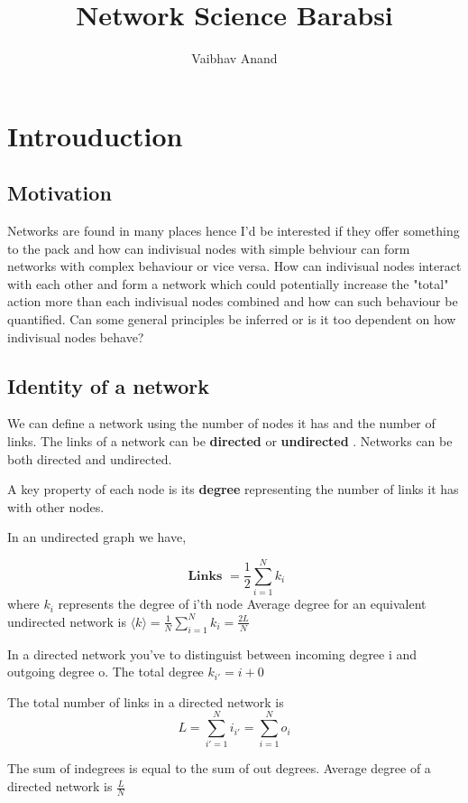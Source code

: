 \documentclass{article}
\title{Network Science Barabsi }
\author{Vaibhav Anand}
\begin{document}
\maketitle

\section{Introuduction}
\subsection{Motivation}

Networks are found in many places hence I'd be interested if they offer something to the pack and how can indivisual nodes with simple behviour can form networks with complex behaviour or vice versa. How can indivisual nodes interact with each other and form a network which could potentially increase the "total" action more than each indivisual nodes combined and how can such behaviour be quantified. Can some general principles be inferred or is it too dependent on how indivisual nodes behave?  

\subsection{Identity of a network}
We can define a network using the number of nodes it has and the number of links. The links of a network can be \textbf{ directed } or \textbf{ undirected }. Networks can be both directed and undirected. 

A key property of each node is its \textbf{ degree } representing the number of links it has with other nodes. 

In an undirected graph we have, 

\[  \textbf{ Links } = \frac {1} {2} \sum_{ i=1 } ^ { N} k_i                    \]
where $ k_i $ represents the degree of i'th node
Average degree for an equivalent undirected network is 
$ \langle k \rangle = \frac {1} {N} \sum_{ i = 1 } ^ { N} k_i = \frac {2L} {N}  $

In a directed network you've to distinguist between incoming degree i and outgoing degree o. The total degree $ k_{i'} = i+ 0 $  




The total number of links in a directed network is 
\[  L = \sum_{ i'=1 } ^ { N} i_{i'} = \sum_{ i= 1 } ^ { N} o_i                      \]

The sum of indegrees is equal to the sum of out degrees. 
Average degree of a directed network is $ \frac {L} {N}  $ 
\end{document}
